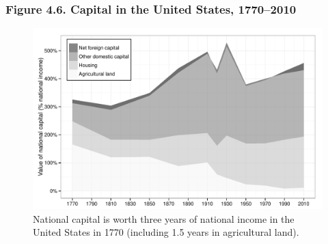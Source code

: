 \documentclass[t]{beamer}\usepackage[]{graphicx}\usepackage[]{color}
\newenvironment{knitrout}{}{} %
\begin{document}
\begin{frame}[label=Figure_4_6]
\frametitle{Figure 4.6. Capital in the United States, 1770--2010}
\begin{figure}[t]
\begin{minipage}[b]{\textwidth}
\centering
\begin{knitrout}\footnotesize
{}\color{fgcolor}

{\centering \includegraphics[width=1\linewidth]{figures/bw/Figure_4_6} 

}



\end{knitrout}
\caption{National capital is worth three years of national income in the United States in 1770 (including 1.5 years in agricultural land).}
\end{minipage}
\end{figure}
\end{frame}
\end{document}
